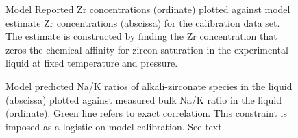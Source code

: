 \documentclass[
]{agujournal2019}
\begin{document}
\begin{figure}


\caption{\label{fig-2}Model Reported Zr concentrations (ordinate)
plotted against model estimate Zr concentrations (abscissa) for the
calibration data set. The estimate is constructed by finding the Zr
concentration that zeros the chemical affinity for zircon saturation in
the experimental liquid at fixed temperature and pressure.}

\end{figure}%

\begin{figure}


\caption{\label{fig-3}Model predicted Na/K ratios of alkali-zirconate
species in the liquid (abscissa) plotted against measured bulk Na/K
ratio in the liquid (ordinate). Green line refers to exact correlation.
This constraint is imposed as a logistic on model calibration. See
text.}

\end{figure}%
\end{document}
